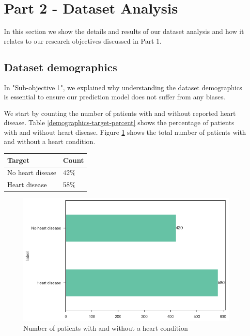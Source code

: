 \section{Part 2 - Dataset Analysis}

In this section we show the details and results of our dataset analysis and how it relates
to our research objectives discussed in Part 1.

\subsection{Dataset demographics}

In "Sub-objective 1", we explained why understanding the dataset demographics is essential to ensure
our prediction model does not suffer from any biases.

We start by counting the number of patients with and without reported heart disease. Table \ref{demographics-target-percent}
shows the percentage of patients with and without heart disease. Figure \ref{demographics-target-count} shows
the total number of patients with and without a heart condition.

\small
\begin{tabularx}{\linewidth}{ | X | X |}
    \caption{Distribution of patients with and without a heart condition}\label{demographics-target-percent} \\
    \hline
    \textbf{Target} & \textbf{Count}\\
    \hline
    No heart disease & 42\% \\
    \hline
    Heart disease & 58\% \\
    \hline
\end{tabularx}
\normalsize

\begin{figure}
    \caption{Number of patients with and without a heart condition}\label{demographics-target-count}
    \centering
    \includegraphics[width=\linewidth]{media/demographics-01-target.png}
\end{figure}

